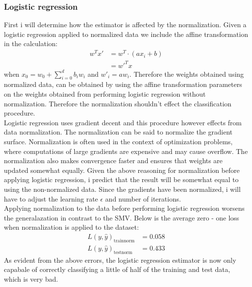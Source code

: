 \documentclass{article}
\begin{document}
\subsubsection{Logistic regression}
First i will determine how the estimator is affected by the normalization. Given a logistic regression applied to normalized data we include the affine transformation in the calculation:
\begin{align*}
w^Tx' &= w^T \cdot (a x_i +b) \\
&= w'^Tx
\end{align*}
when $x_0 = w_0 + \sum_{i=0}^d b_i w_i$ and $ w'_i = a w_i$. Therefore the weights obtained using normalized data, can be obtained by using the affine transformation parameters on the weights obtained from performing logistic regression without normalization. Therefore the normalization shouldn't effect the classification procedure. \\
Logistic regression uses gradient decent and this procedure however effects from data normalization. The normalization can be said to normalize the gradient surface. Normalization is often  used in the context of optimization problems, where computations of large gradients are expensive and may cause overflow. The normalization also makes convergence faster and ensures that weights are updated somewhat equally. Given the above reasoning for normalization before applying logistic regression, i predict that the result will be somewhat equal to using the non-normalized data. Since the gradients have been normalized, i will have to adjust the learning rate $\epsilon$ and number of iterations. \\
Applying normalization to the data before performing logistic regression worsens the generalazation in contrast to the SMV. Below is the average zero - one loss when normalization is applied to the dataset:
\begin{align*}
L(y,\hat{y})_{\text{trainnorm}} &= 0.058 \\
L(y,\hat{y})_{\text{testnorm}} &= 0.433
\end{align*}
As evident from the above errors, the logistic regression estimator is now only capabale of correctly classifying a little of half of the training and test data, which is very bad.
\end{document}
